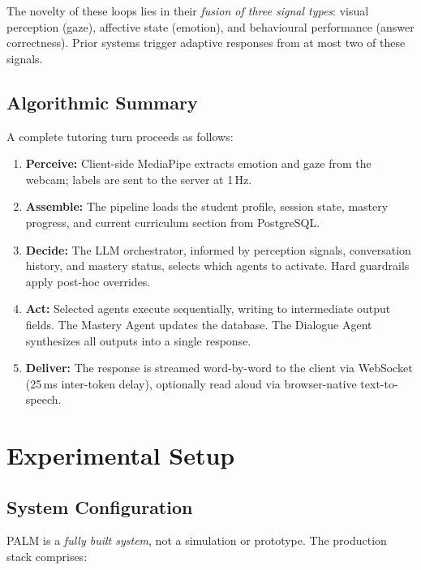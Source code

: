 \documentclass[conference, letterpaper]{IEEEtran}
\begin{document}
The novelty of these loops lies in their \emph{fusion of three signal types}: visual perception (gaze), affective state (emotion), and behavioural performance (answer correctness). Prior systems trigger adaptive responses from at most two of these signals.

\subsection{Algorithmic Summary}

A complete tutoring turn proceeds as follows:
\begin{enumerate}[nosep]
    \item \textbf{Perceive:} Client-side MediaPipe extracts emotion and gaze from the webcam; labels are sent to the server at 1\,Hz.
    \item \textbf{Assemble:} The pipeline loads the student profile, session state, mastery progress, and current curriculum section from PostgreSQL.
    \item \textbf{Decide:} The LLM orchestrator, informed by perception signals, conversation history, and mastery status, selects which agents to activate. Hard guardrails apply post-hoc overrides.
    \item \textbf{Act:} Selected agents execute sequentially, writing to intermediate output fields. The Mastery Agent updates the database. The Dialogue Agent synthesizes all outputs into a single response.
    \item \textbf{Deliver:} The response is streamed word-by-word to the client via WebSocket (25\,ms inter-token delay), optionally read aloud via browser-native text-to-speech.
\end{enumerate}

\section{Experimental Setup}

\subsection{System Configuration}

PALM is a \emph{fully built system}, not a simulation or prototype. The production stack comprises:
\end{document}
